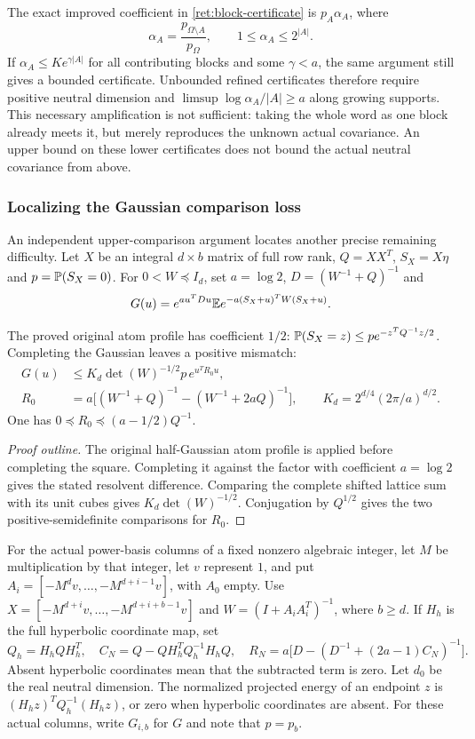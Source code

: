 The exact improved coefficient in \eqref{ret:block-certificate} is $p_A\alpha_A$, where
\[
 \alpha_A=\frac{p_{\Omega\setminus A}}{p_\Omega},
 \qquad1\le\alpha_A\le2^{|A|}.
\]
If $\alpha_A\le Ke^{\gamma|A|}$ for all contributing blocks and some $\gamma<a$, the same argument still gives a bounded certificate.
Unbounded refined certificates therefore require positive neutral dimension and $\limsup\log\alpha_A/|A|\ge a$ along growing supports.
This necessary amplification is not sufficient: taking the whole word as one block already meets it, but merely reproduces the unknown actual covariance.
An upper bound on these lower certificates does not bound the actual neutral covariance from above.

\subsubsection{Localizing the Gaussian comparison loss}
\label{ret:neutral-rank}

An independent upper-comparison argument locates another precise remaining difficulty.
Let $X$ be an integral $d\times b$ matrix of full row rank, $Q=XX^T$, $S_X=X\eta$ and $p=\mathbb P(S_X=0)$.
For $0<W\preceq I_d$, set $a=\log2$, $D=(W^{-1}+Q)^{-1}$ and
\[
 G(u)=e^{au^TDu}\mathbb E e^{-a(S_X+u)^TW(S_X+u)}.
\]
\begin{proposition}\label{ret:gaussian-profile}
The proved original atom profile has coefficient $1/2$:
$\mathbb P(S_X=z)\le pe^{-z^TQ^{-1}z/2}$.
Completing the Gaussian leaves a positive mismatch:
\begin{align*}
 G(u)&\le K_d\det(W)^{-1/2}p\,e^{u^TR_0u},\\
 R_0&=a\bigl[(W^{-1}+Q)^{-1}-(W^{-1}+2aQ)^{-1}\bigr],
 \qquad K_d=2^{d/4}(2\pi/a)^{d/2}.
\end{align*}
One has $0\preceq R_0\preceq(a-1/2)Q^{-1}$.
\end{proposition}
\begin{proof}[Proof outline]
The original half-Gaussian atom profile is applied before completing the square.
Completing it against the factor with coefficient $a=\log2$ gives the stated resolvent difference.
Comparing the complete shifted lattice sum with its unit cubes gives $K_d\det(W)^{-1/2}$.
Conjugation by $Q^{1/2}$ gives the two positive-semidefinite comparisons for $R_0$.
\end{proof}

For the actual power-basis columns of a fixed nonzero algebraic integer, let $M$ be multiplication by that integer, let $v$ represent $1$, and put $A_i=[-M^dv,\ldots,-M^{d+i-1}v]$, with $A_0$ empty.
Use $X=[-M^{d+i}v,\ldots,-M^{d+i+b-1}v]$ and $W=(I+A_iA_i^T)^{-1}$, where $b\geq d$.
If $H_h$ is the full hyperbolic coordinate map, set
\[
 Q_h=H_hQH_h^T,\quad C_N=Q-QH_h^TQ_h^{-1}H_hQ,\quad
 R_N=a\bigl[D-(D^{-1}+(2a-1)C_N)^{-1}\bigr].
\]
Absent hyperbolic coordinates mean that the subtracted term is zero.
Let $d_0$ be the real neutral dimension.
The normalized projected energy of an endpoint $z$ is $(H_hz)^TQ_h^{-1}(H_hz)$, or zero when hyperbolic coordinates are absent.
For these actual columns, write $G_{i,b}$ for $G$ and note that $p=p_b$.

